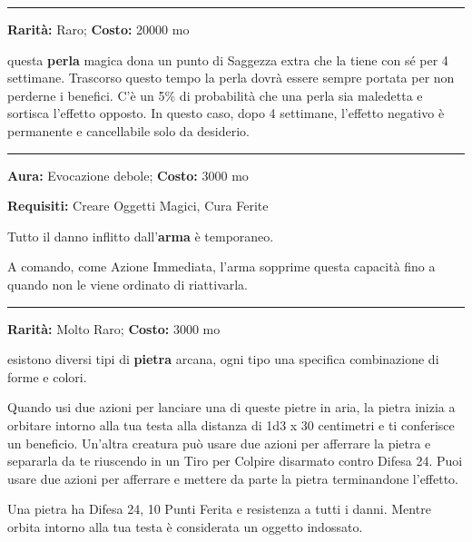 \begin{multicols}{2}
\smallskip\noindent\rule{\linewidth}{2pt}  \hypertarget{PerladellaSaggezza}{}\medskip{}\noindent\label{PerladellaSaggezza}

\textbf{Rarità:} Raro; \textbf{Costo:} 20000 mo

questa \textbf{perla} magica dona un punto di Saggezza extra che la tiene con sé per 4 settimane. Trascorso questo tempo la perla dovrà essere sempre portata per non perderne i benefici. C'è un 5\% di probabilità che una perla sia maledetta e sortisca l'effetto opposto. In questo caso, dopo 4 settimane, l'effetto negativo è permanente e cancellabile solo da desiderio.

\smallskip\noindent\rule{\linewidth}{2pt}  \hypertarget{Pietosa}{}\medskip{}\noindent\label{Pietosa}

\textbf{Aura:} Evocazione debole; \textbf{Costo:} 3000 mo

\textbf{Requisiti:} Creare Oggetti Magici, Cura Ferite

Tutto il danno inflitto dall'\textbf{arma} è temporaneo.

A comando, come Azione Immediata, l'arma sopprime questa capacità fino a quando non le viene ordinato di riattivarla.

\smallskip\noindent\rule{\linewidth}{2pt}  \hypertarget{PietraArcana}{}\medskip{}\noindent\label{PietraArcana}

\textbf{Rarità:} Molto Raro; \textbf{Costo:} 3000 mo

esistono diversi tipi di \textbf{pietra} arcana, ogni tipo una specifica combinazione di forme e colori.

Quando usi due azioni per lanciare una di queste pietre in aria, la pietra inizia a orbitare intorno alla tua testa alla distanza di 1d3 x 30 centimetri e ti conferisce un beneficio.
Un'altra creatura può usare due azioni per afferrare la pietra e separarla da te riuscendo in un Tiro per Colpire disarmato contro Difesa 24. Puoi usare due azioni per afferrare e mettere da parte la pietra terminandone l'effetto.

Una pietra ha Difesa 24, 10 Punti Ferita e resistenza a tutti i danni. Mentre orbita intorno alla tua testa è considerata un oggetto indossato.


\end{multicols}

